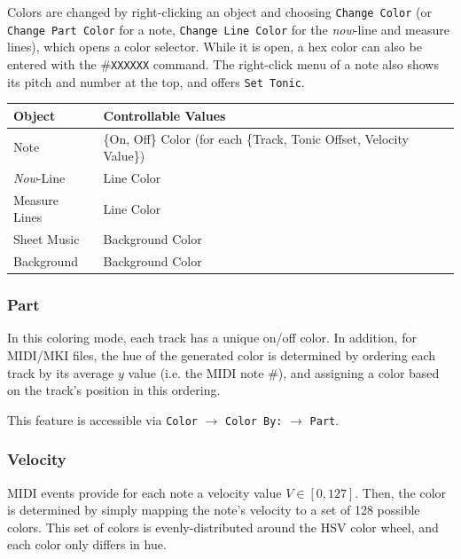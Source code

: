 \documentclass[english]{article}
\makeatletter
\newenvironment{restoretext}%
    {\@parboxrestore%
     \begin{adjustwidth}{}{\leftmargin}%
    }{\end{adjustwidth}
     }
\def\rcbegin{\begin{restoretext}\centering}
\def\rcend{\end{restoretext}}
\providecommand{\mi}[1]{\texttt{#1}}
\makeatother
\begin{document}
Colors are changed by right-clicking an object and choosing \mi{Change Color} (or \mi{Change Part Color} for a note,
\mi{Change Line Color} for the \textit{now}-line and measure lines), which opens a color selector. While it is open,
a hex color can also be entered with the \#\mi{XXXXXX} command. The right-click menu of a note also shows its pitch and
number at the top, and offers \mi{Set Tonic}.

\vspace{1em}

\rcbegin
\begin{tabular}{|l|l|}
  \hline
  \textbf{Object}           & \textbf{Controllable Values} \\
  \hline
  Note                    & \{On, Off\} Color (for each \{Track, Tonic Offset, Velocity Value\})\\
  \textit{Now}-Line       & Line Color \\
  Measure Lines           & Line Color \\
  Sheet Music             & Background Color \\
  Background              & Background Color \\
  \hline
\end{tabular}
\rcend

\vspace{1em}

\subsubsection{Part}

In this coloring mode, each track has a unique on/off color. In addition, for MIDI/MKI files, the hue of the generated
color is determined by ordering each track by its average $y$ value (i.e. the MIDI note \#), and assigning
a color based on the track's position in this ordering.

This feature is accessible via 
\mi{Color} $\rightarrow$ \mi{Color By:} $\rightarrow$ \mi{Part}.

\subsubsection{Velocity}

MIDI events provide for each note a velocity value $V \in [0, 127]$. Then, the color is determined by simply mapping 
the note's velocity to a set of 128 possible colors. This set of colors is evenly-distributed around
the HSV color wheel, and each color only differs in hue.
\end{document}

